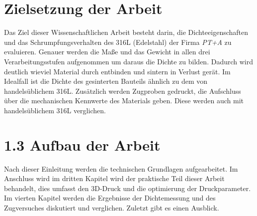 \section{Zielsetzung der Arbeit}

Das Ziel dieser Wissenschaftlichen Arbeit besteht darin, die Dichteeigenschaften und das Schrumpfungsverhalten des 316L (Edelstahl) der Firma \textit{PT+A} zu evaluieren. 
Genauer werden die Maße und das Gewicht in allen drei Verarbeitungsstufen aufgenommen um daraus die Dichte zu bilden. Dadurch wird deutlich wieviel Material durch entbinden und sintern in Verlust gerät.
Im Idealfall ist die Dichte des gesinterten Bauteils ähnlich zu dem von handelsüblichem 316L.
Zusätzlich werden Zugproben gedruckt, die Aufschluss über die mechanischen Kennwerte des Materials geben. Diese werden auch mit handelsüblichem 316L verglichen.
    
\section{1.3 Aufbau der Arbeit}

Nach dieser Einleitung werden die technischen Grundlagen aufgearbeitet. Im Anschluss wird im dritten Kapitel wird der praktische Teil dieser Arbeit behandelt, dies umfasst den 3D-Druck und die optimierung der Druckparameter. Im vierten Kapitel werden die Ergebnisse der Dichtemessung und des Zugversuches diskutiert und verglichen. Zuletzt gibt es einen Ausblick.
